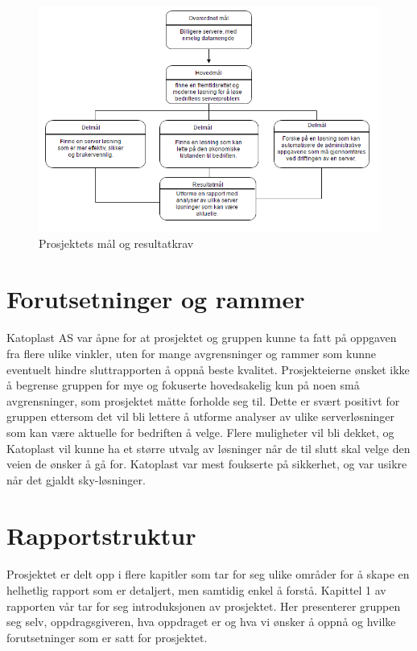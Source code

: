 \begin{figure}[H]
\centering
\includegraphics[width=6.5in]{Bilder/maal.PNG}
\caption{Prosjektets mål og resultatkrav}
\end{figure}

\section{Forutsetninger og rammer}

\paragraph{}Katoplast AS var åpne for at prosjektet og gruppen kunne ta fatt på oppgaven fra flere ulike vinkler, uten for mange avgrensninger og rammer som kunne eventuelt hindre sluttrapporten å oppnå beste kvalitet. Prosjekteierne ønsket ikke å begrense gruppen for mye og fokuserte hovedsakelig kun på noen små avgrensninger, som prosjektet måtte forholde seg til. Dette er svært positivt for gruppen ettersom det vil bli lettere å utforme analyser av ulike serverløsninger som kan være aktuelle for bedriften å velge. Flere muligheter vil bli dekket, og Katoplast vil kunne ha et større utvalg av løsninger når de til slutt skal velge den veien de ønsker å gå for. Katoplast var mest foukserte på sikkerhet, og var usikre når det gjaldt sky-løsninger. 

\section{Rapportstruktur}
\paragraph{} Prosjektet er delt opp i flere kapitler som tar for seg ulike områder for å skape en helhetlig rapport som er detaljert, men samtidig  enkel å forstå. Kapittel 1 av rapporten vår tar for seg introduksjonen av prosjektet. Her presenterer gruppen seg selv, oppdragsgiveren, hva oppdraget er og hva vi ønsker å oppnå og hvilke forutsetninger som er satt for prosjektet.

